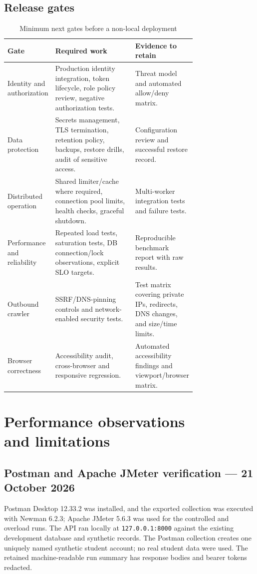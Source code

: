 \documentclass[11pt,a4paper,oneside]{report}
\begin{document}
\section{Release gates}
\begin{table}[htbp]
\centering\small
\caption{Minimum next gates before a non-local deployment}\label{tab:release-gates}
\begin{tabularx}{\linewidth}{@{}p{0.24\linewidth}p{0.51\linewidth}X@{}}\toprule
\textbf{Gate} & \textbf{Required work} & \textbf{Evidence to retain} \\\midrule
Identity and authorization & Production identity integration, token lifecycle, role policy review, negative authorization tests. & Threat model and automated allow/deny matrix. \\
Data protection & Secrets management, TLS termination, retention policy, backups, restore drills, audit of sensitive access. & Configuration review and successful restore record. \\
Distributed operation & Shared limiter/cache where required, connection pool limits, health checks, graceful shutdown. & Multi-worker integration tests and failure tests. \\
Performance and reliability & Repeated load tests, saturation tests, DB connection/lock observations, explicit SLO targets. & Reproducible benchmark report with raw results. \\
Outbound crawler & SSRF/DNS-pinning controls and network-enabled security tests. & Test matrix covering private IPs, redirects, DNS changes, and size/time limits. \\
Browser correctness & Accessibility audit, cross-browser and responsive regression. & Automated accessibility findings and viewport/browser matrix. \\
\bottomrule
\end{tabularx}
\end{table}

\chapter[Performance observations]{Performance observations\\and limitations}
\section{Postman and Apache JMeter verification — 21 October 2026}
Postman Desktop 12.33.2 was installed, and the exported collection was executed with Newman 6.2.3; Apache JMeter 5.6.3 was used for the controlled and overload runs. The API ran locally at \texttt{127.0.0.1:8000} against the existing development database and synthetic records. The Postman collection creates one uniquely named synthetic student account; no real student data were used. The retained machine-readable run summary has response bodies and bearer tokens redacted.
\end{document}
